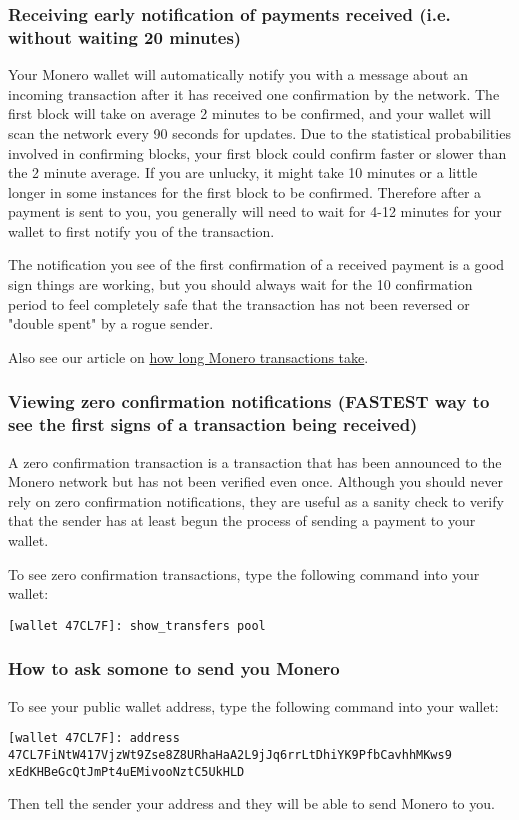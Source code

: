 \subsubsection{Receiving early notification of payments received (i.e. without waiting 20 minutes)}
	Your Monero wallet will automatically notify you with a message about an incoming transaction after it has received one confirmation by the network. The first block will take on average 2 minutes to be confirmed, and your wallet will scan the network every 90 seconds for updates. Due to the statistical probabilities involved in confirming blocks, your first block could confirm faster or slower than the 2 minute average. If you are unlucky, it might take 10 minutes or a little longer in some instances for the first block to be confirmed. Therefore after a payment is sent to you, you generally will need to wait for 4-12 minutes for your wallet to first notify you of the transaction. 
	\begin{importantbox}
		The notification you see of the first confirmation of a received payment is a good sign things are working, but you should always wait for the 10 confirmation period to feel completely safe that the transaction has not been reversed or "double spent" by a rogue sender. 
	\end{importantbox}
	Also see our article on \href{https://www.monero.how/how-long-do-monero-transactions-take}{how long Monero transactions take}.
\subsubsection{Viewing zero confirmation notifications (FASTEST way to see the first signs of a transaction being received)}
	A zero confirmation transaction is a transaction that has been announced to the Monero network but has not been verified even once. Although you should never rely on zero confirmation notifications, they are useful as a sanity check to verify that the sender has at least begun the process of sending a payment to your wallet. \par
	To see zero confirmation transactions, type the following command into your wallet:
\begin{lstlisting}
[wallet 47CL7F]: show_transfers pool
\end{lstlisting}
\subsubsection{How to ask somone to send you Monero}
	To see your public wallet address, type the following command into your wallet:
\begin{lstlisting}
[wallet 47CL7F]: address 47CL7FiNtW417VjzWt9Zse8Z8URhaHaA2L9jJq6rrLtDhiYK9PfbCavhhMKws9 xEdKHBeGcQtJmPt4uEMivooNztC5UkHLD
\end{lstlisting}
	Then tell the sender your address and they will be able to send Monero to you.
